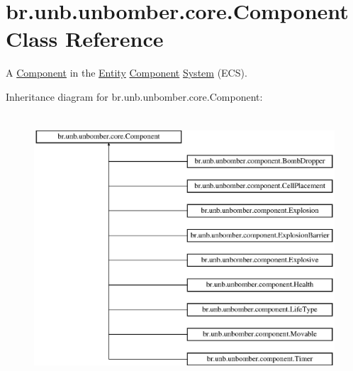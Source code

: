 \hypertarget{classbr_1_1unb_1_1unbomber_1_1core_1_1_component}{\section{br.\+unb.\+unbomber.\+core.\+Component Class Reference}
\label{classbr_1_1unb_1_1unbomber_1_1core_1_1_component}
}


A \hyperlink{classbr_1_1unb_1_1unbomber_1_1core_1_1_component}{Component} in the \hyperlink{classbr_1_1unb_1_1unbomber_1_1core_1_1_entity}{Entity} \hyperlink{classbr_1_1unb_1_1unbomber_1_1core_1_1_component}{Component} \hyperlink{interfacebr_1_1unb_1_1unbomber_1_1core_1_1_system}{System} (E\+C\+S).  


Inheritance diagram for br.\+unb.\+unbomber.\+core.\+Component\+:\begin{figure}[H]
\begin{center}
\leavevmode
\includegraphics[height=10.000000cm]{classbr_1_1unb_1_1unbomber_1_1core_1_1_component}
\end{center}
\end{figure}
